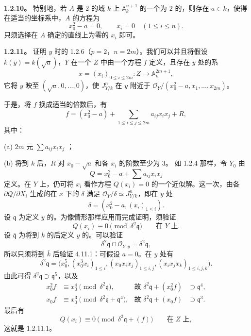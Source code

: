 \textbf{1.2.10。} 特别地，若 $A$ 是 $2$ 的域 $k$ 上 $\mathbb A_k^{n+1}$ 的一个为 $2$ 的，则存在 $a\in k$，使得在适当的坐标系中，$A$ 的方程为
\[
 x_0^2-a=0,\qquad x_i=0\quad(1\leq i\leq n).
\]
只须选择在 $A$ 确定的直线上为零的 $x_i$ 即可。

\textbf{1.2.11。} 证明 $y$ 时的 1.2.6（$p=2$，$n=2m$）。我们可以并且将假设 $k(y)=k(\sqrt a)$，$Y$ 在一个 $Z$ 中由一个方程 $f$ 定义，且存在 $y$ 处的系
\[
 x=(x_i)_{0\leq i\leq2m}:Z\longrightarrow\mathbb A_k^{2m+1},
\]
它将 $y$ 映至 $(\sqrt a,0,\ldots,0)$，使 $J^n_{Y/k}$ 在 $y$ 附近于
$\mathscr O_Y/(x_0^2-a,x_1,\ldots,x_{2m})$。

于是，将 $f$ 换成适当的倍数后，有
\[
 f=(x_0^2-a)+\sum_{1\leq i\leq j\leq2m}a_{ij}x_i x_j+R,
\]
其中：

(a) $2m$ 元 $\sum a_{ij}x_i x_j$ ；

(b) 将到 $\bar k$ 后，$R$ 对 $x_0-\sqrt a$ 和各 $x_i$ 的阶数至少为 $3$。
如 1.2.4 那样，令 $Y_0$ 由
\[
 Q=x_0^2-a+\sum a_{ij}x_i x_j
\]
定义。在 $Y$ 上，仍可将 $x_i$ 看作方程 $Q(x_i)=0$ 的一个近似解。这一次，由各 $\partial Q/\partial X_i$ 生成的在 $x$ 下的 $\delta$ 满足 $\mathscr O_Y/\delta\simeq J^n_{Y/k}$，即在 $y$ 处
\[
 \delta=(x_0^2-a,(x_i)_{1\leq i}).
\]
设 $\mathfrak q$ 为定义 $y$ 的。为像情形那样应用而完成证明，须验证
\[
 Q(x_i)\equiv0\pmod{\delta^2\mathfrak q}\qquad\text{在 }Y\text{ 上}.\tag{1.2.11.1}
\]
设 $\bar{\mathfrak q}$ 为将到 $k$ 的后定义 $y$ 的。可以验证
\[
 \delta^2\bar{\mathfrak q}\cap\mathscr O_{Y,y}=\delta^2\mathfrak q,
\]
所以只须将到 $\bar k$ 后验证 4.11.1：可假设 $a=0$。在 $y$ 处有
\[
 \delta^2\mathfrak q=
 \bigl(x_0^5,(x_0^3x_i)_{1\leq i},(x_0x_ix_j)_{1\leq i,j},
 (x_ix_jx_k)_{1\leq i,j,k}\bigr).
\]
由此可得 $\delta^2\mathfrak q\supset\mathfrak q^5$，以及
\[
\begin{aligned}
x_0^2f&\equiv x_0^4\pmod{\delta^2\mathfrak q},
&\text{故 }\delta^2\mathfrak q+(x_0^2f)&\supset\mathfrak q^4,\\
x_0f&\equiv x_0^3\pmod{\delta^2\mathfrak q+\mathfrak q^4},
&\text{故 }\delta^2\mathfrak q+(x_0f)&\supset\mathfrak q^3.
\end{aligned}
\]
最后有
\[
 Q(x_i)\equiv0\pmod{\delta^2\mathfrak q+(f)}\qquad\text{在 }Z\text{ 上},
\]
这就是 1.2.11.1。

